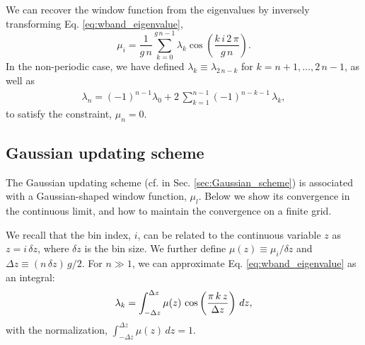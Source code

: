 \documentclass[reprint, superscriptaddress, floatfix]{revtex4-1}
\begin{document}

We can recover the window function from the eigenvalues
by inversely transforming Eq. \eqref{eq:wband_eigenvalue},
%
\begin{equation}
  \mu_i
  =
  \frac { 1 } { g \, n }
  \sum_{ k = 0 }^{ g \, n - 1 }
  \lambda_k
  \cos \left(
       \frac{ k \, i \, 2 \, \pi }
            {      g \, n        }
  \right)
  .
\label{eq:mu_from_lambda}
\end{equation}
%
In the non-periodic case,
we have defined
$\lambda_k \equiv \lambda_{2 \, n - k}$
for $k = n + 1, \dots, 2 \, n - 1$,
as well as
%
\begin{align}
  \lambda_n
  =
  (-1)^{ n - 1 }
  \lambda_0
  +
  2 \, \sum_{ k = 1 }^{ n - 1 }
      (-1)^{n - k - 1} \, \lambda_k
  ,
\label{eq:lambdan}
\end{align}
to satisfy the constraint, $\mu_n = 0$.
%





\subsection{\label{sec:Gaussian_math}
Gaussian updating scheme}



The Gaussian updating scheme (cf. in Sec. \ref{sec:Gaussian_scheme})
is associated with a Gaussian-shaped window function, $\mu_l$.
%
%
Below we show its convergence
in the continuous limit,
and how to maintain the convergence
on a finite grid.



We recall that
the bin index, $i$, can be related to
the continuous variable $z$ as
$z = i \, \delta z$,
where
$\delta z$ is the bin size.
%
We further define
$\mu(z) \equiv \mu_i/\delta z$
and
$\Delta z \equiv (n \, \delta z) \, g / 2$.
%
For $n \gg 1$,
we can approximate Eq. \eqref{eq:wband_eigenvalue}
as an integral:
%
\begin{equation}
  \lambda_k
  =
  \int_{-\Delta z}^{\Delta z}
    \mu(z) \, \cos\left( \frac{ \pi \, k \, z } { \Delta z} \right)
    \, d z,
  \notag
\end{equation}
%
with the normalization,
$\int_{-\Delta z}^{\Delta z} \mu(z) \, dz = 1$.
\end{document}
